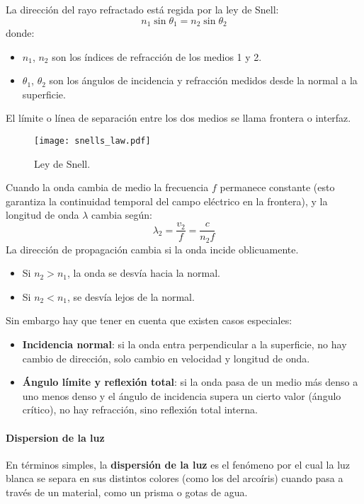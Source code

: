 La dirección del rayo refractado está regida por la ley de Snell:
\[
n_1 \sin \theta_1 = n_2 \sin \theta_2
\]
donde:
\begin{itemize}
  \item \(n_1\), \(n_2\) son los índices de refracción de los medios 1 y 2.
  \item \(\theta_1\), \(\theta_2\) son los ángulos de incidencia y refracción medidos desde la normal a la superficie.
\end{itemize}

El límite o línea de separación entre los dos medios se llama frontera o interfaz.

\begin{figure}[ht]
  \centering
  \texttt{[image: snells\_law.pdf]}
  \caption{Ley de Snell.}
  \label{fig:snells_law}
\end{figure}

Cuando la onda cambia de medio la frecuencia \(f\) permanece constante (esto garantiza la continuidad temporal del campo eléctrico en la frontera), y la longitud de onda \(\lambda\) cambia según:
\[
\lambda_2 = \frac{v_2}{f} = \frac{c}{n_2 f}
\]
La dirección de propagación cambia si la onda incide oblicuamente.
\begin{itemize}
  \item Si \(n_2 > n_1\), la onda se desvía hacia la normal.
  \item Si \(n_2 < n_1\), se desvía lejos de la normal.
\end{itemize}
Sin embargo hay que tener en cuenta que existen casos especiales:
\begin{itemize}
  \item \textbf{Incidencia normal}: si la onda entra perpendicular a la superficie, no hay cambio de dirección, solo cambio en velocidad y longitud de onda.
  \item \textbf{Ángulo límite y reflexión total}: si la onda pasa de un medio más denso a uno menos denso y el ángulo de incidencia supera un cierto valor (ángulo crítico), no hay refracción, sino reflexión total interna.
\end{itemize}

\paragraph{Dispersion de la luz}

En términos simples, la \textbf{dispersión de la luz} es el fenómeno por el cual la luz blanca se separa en sus distintos colores (como los del arcoíris) cuando pasa a través de un material, como un prisma o gotas de agua.

